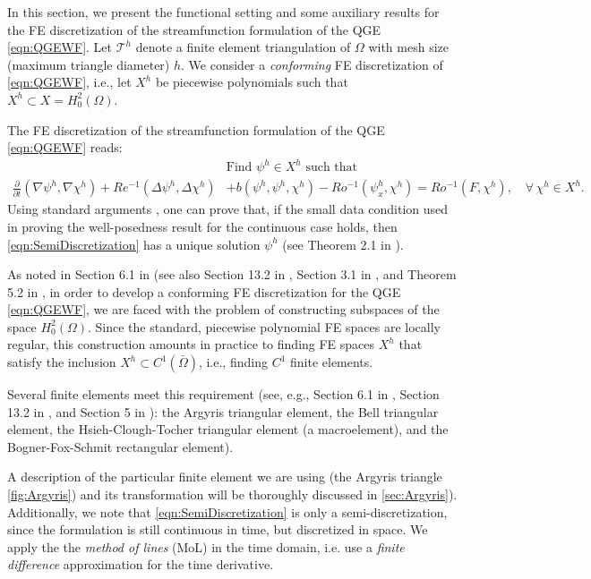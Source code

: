 In this section, we present the functional setting and some auxiliary results
for the FE discretization of the streamfunction formulation of the QGE
\eqref{eqn:QGEWF}. Let $\mathcal{T}^h$ denote a finite element triangulation of
$\Omega$ with mesh size (maximum triangle diameter) $h$. We consider a
\emph{conforming} FE discretization of \eqref{eqn:QGEWF}, i.e., let $X^h$ be
piecewise polynomials such that $X^h \subset X = H_0^2(\Omega)$.

The FE discretization of the streamfunction formulation of the QGE
\eqref{eqn:QGEWF} reads:
\begin{equation}
  \begin{split}
    &\text{Find } \psi^h \in X^h \text{ such that} \\
    \frac{\partial}{\partial t} (\nabla \psi^h, \nabla \chi^h)
      + Re^{-1} (\Delta \psi^h, \Delta \chi^h)
      &+ b(\psi^h,\psi^h,\chi^h)
      - Ro^{-1} (\psi_x^h,\chi^h)
      = Ro^{-1}(F,\chi^h),\quad \forall \, \chi^h \in X^h.
    \label{eqn:SemiDiscretization}
  \end{split}
\end{equation}
Using standard arguments \cite{Girault79,Girault86}, one can prove that, if the
small data condition used in proving the well-posedness result for the
continuous case holds, then \eqref{eqn:SemiDiscretization} has a unique solution
$\psi^h$ (see Theorem 2.1 in \cite{Cayco86}).

As noted in Section 6.1 in \cite{Ciarlet} (see also Section 13.2 in
\cite{Gunzburger89}, Section 3.1 in \cite{Johnson}, and Theorem 5.2 in
\cite{Braess}, in order to develop a conforming FE discretization for the QGE
\eqref{eqn:QGEWF}, we are faced with the problem of constructing subspaces of
the space $H^2_0(\Omega)$. Since the standard, piecewise polynomial FE spaces
are locally regular, this construction amounts in practice to finding FE spaces
$X^h$ that satisfy the inclusion $X^h \subset C^1({\bar \Omega})$, i.e., finding
$C^1$ finite elements.

Several finite elements meet this requirement (see, e.g., Section 6.1 in
\cite{Ciarlet}, Section 13.2 in \cite{Gunzburger89}, and Section 5 in
\cite{Braess}): the Argyris triangular element, the Bell triangular element, the
Hsieh-Clough-Tocher triangular element (a macroelement), and the
Bogner-Fox-Schmit rectangular element).

A description of the particular finite element we are using (the Argyris
triangle \autoref{fig:Argyris}) and its transformation will be thoroughly
discussed in \autoref{sec:Argyris}). Additionally, we note that
\eqref{eqn:SemiDiscretization} is only a semi-discretization, since the
formulation is still continuous in time, but discretized in space.  We apply the
the \emph{method of lines} (MoL) in the time domain, i.e. use a \emph{finite
difference} approximation for the time derivative.

